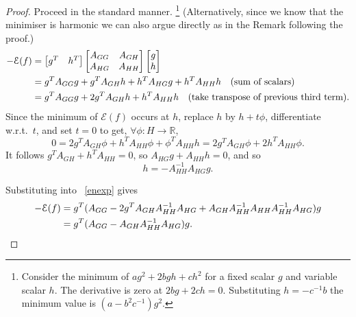 \documentclass[a4paper]{amsart}
\theoremstyle{plain}
\theoremstyle{definition}
\theoremstyle{remark}
\begin{document}
\begin{proof} Proceed in the standard manner.  
\footnote{Consider the minimum of $ a g^2 + 2bgh + c h^2 $ for a fixed scalar $ g $   and variable scalar $ h $.  The derivative is zero at $ 2bg + 2ch = 0 $.  Substituting  $ h= -c^{-1}b  $   
the minimum value is $   (a-b^2c^{-1})g^2$.}
(Alternatively, since we know that the minimiser is harmonic we  can also argue directly as in the Remark following the proof.)
\begin{align}
-\mathcal{E}(f) &= 
 \begin{bmatrix} %
      g^T & h^T \\
   \end{bmatrix} 
 \begin{bmatrix} %
       A_{GG} & A_{GH} \\
      A_{HG} & A_{HH} \\
   \end{bmatrix}
\begin{bmatrix} %
      g  \\ h           \\
   \end{bmatrix}    \notag \\
&= g^TA_{GG}g + g^T A_{GH} h + h^T A_{HG} g + h^T A_{HH} h \quad \text{(sum of scalars)}  \notag\\
&= g^TA_{GG}g + 2g^T A_{GH} h + h^T A_{HH} h \quad \text{(take transpose of previous third term)}. \label{enexp}
   \end{align} 
 Since the minimum of $  \mathcal{E}(f) $ occurs at  $ h $, replace $ h $ by $ h+t\phi  $, differentiate w.r.t.\ $ t $, and set $ t=0 $ to get, $ \forall \phi:H\to \mathbb{R}$,
\[
0 = 2 g^T A_{GH} \phi + h^T A_{HH}\phi + \phi^T A_{HH} h   
   =   2 g^T A_{GH} \phi + 2h^T A_{HH}\phi .
\]   
It follows $ g^T A_{GH}  +  h^T A_{HH}= 0 $, so $ A_{HG}g + A_{HH}h = 0  $, and so 
\[ h = - A_{HH}^{-1}A_{HG}g.\]   
   
  Substituting into  ~\eqref{enexp} gives 
\begin{align*} 
 - \mathcal{E}(f) &= g^T(A_{GG} - 2g^TA_{GH}A_{HH}^{-1}A_{HG} + 
                  A_{GH}A_{HH}^{-1}A_{HH}A_{HH}^{-1}A_{HG}) g\\
                  &= g^T(A_{GG} - A_{GH} A_{HH}^{-1} A_{HG})g. \qedhere
 \end{align*} 
      \end{proof} 
      
\end{document}
